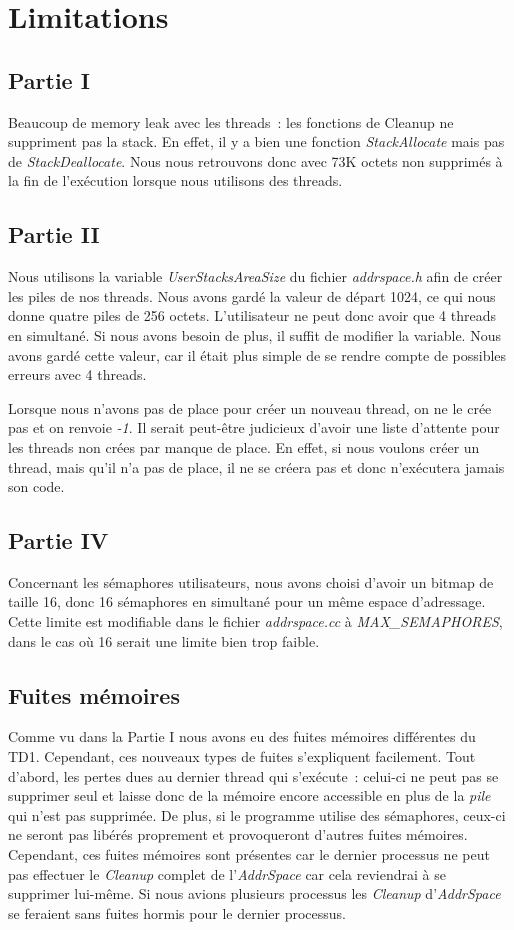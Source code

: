 \documentclass{article}
\begin{document}
\section{Limitations}
\subsection{Partie I}
Beaucoup de memory leak avec les threads : les fonctions de Cleanup ne
suppriment pas la stack. En effet, il y a bien une fonction
\textit{StackAllocate} mais pas de \textit{StackDeallocate}. Nous nous
retrouvons donc avec 73K octets non supprimés à la fin de l'exécution lorsque
nous utilisons des threads.

\subsection{Partie II}
Nous utilisons la variable \textit{UserStacksAreaSize} du fichier
\textit{addrspace.h} afin de créer les piles de nos threads. Nous avons gardé
la valeur de départ 1024, ce qui nous donne quatre piles de 256 octets.
L'utilisateur ne peut donc avoir que 4 threads en simultané. Si nous avons
besoin de plus, il suffit de modifier la variable. Nous avons gardé cette
valeur, car il était plus simple de se rendre compte de possibles erreurs avec
4 threads.

Lorsque nous n'avons pas de place pour créer un nouveau thread, on ne le crée pas et on renvoie
\textit{-1}. Il serait peut-être judicieux d'avoir une liste d'attente pour les threads non 
crées par manque de place. En effet, si nous voulons créer un thread, mais qu'il n'a pas de place,
il ne se créera pas et donc n'exécutera jamais son code.

\subsection{Partie IV}
Concernant les sémaphores utilisateurs, nous avons choisi d'avoir un bitmap de
taille 16, donc 16 sémaphores en simultané pour un même espace d'adressage.
Cette limite est modifiable dans le fichier \textit{addrspace.cc} à
\textit{MAX\_SEMAPHORES}, dans le cas où 16 serait une limite bien trop faible.

\subsection{Fuites mémoires}
Comme vu dans la Partie I nous avons eu des fuites mémoires différentes du TD1. Cependant, ces nouveaux types
de fuites s'expliquent facilement. 
Tout d'abord, les pertes dues au dernier thread qui s'exécute : celui-ci ne peut pas se supprimer seul et laisse
donc de la mémoire encore accessible en plus de la \textit{pile} qui n'est pas supprimée. De plus, si le programme
utilise des sémaphores, ceux-ci ne seront pas libérés proprement et provoqueront d'autres fuites mémoires. 
Cependant, ces fuites mémoires sont présentes car le dernier processus ne peut pas effectuer le \textit{Cleanup} complet 
de l'\textit{AddrSpace} car cela reviendrai à se supprimer lui-même. Si nous avions plusieurs processus les \textit{Cleanup}
d'\textit{AddrSpace} se feraient sans fuites hormis pour le dernier processus.
\end{document}
